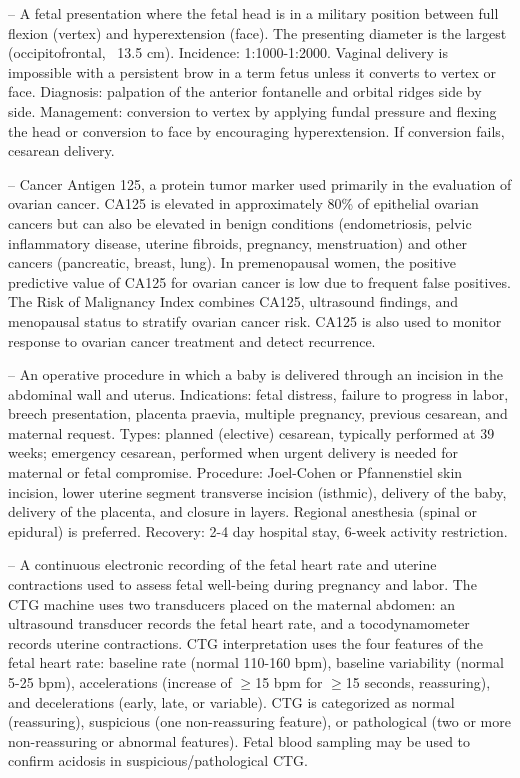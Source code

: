 -- A fetal presentation where the fetal head is in a military position between full flexion (vertex) and hyperextension (face). The presenting diameter is the largest (occipitofrontal, ~13.5 cm). Incidence: 1:1000-1:2000. Vaginal delivery is impossible with a persistent brow in a term fetus unless it converts to vertex or face. Diagnosis: palpation of the anterior fontanelle and orbital ridges side by side. Management: conversion to vertex by applying fundal pressure and flexing the head or conversion to face by encouraging hyperextension. If conversion fails, cesarean delivery.

-- Cancer Antigen 125, a protein tumor marker used primarily in the evaluation of ovarian cancer. CA125 is elevated in approximately 80\% of epithelial ovarian cancers but can also be elevated in benign conditions (endometriosis, pelvic inflammatory disease, uterine fibroids, pregnancy, menstruation) and other cancers (pancreatic, breast, lung). In premenopausal women, the positive predictive value of CA125 for ovarian cancer is low due to frequent false positives. The Risk of Malignancy Index combines CA125, ultrasound findings, and menopausal status to stratify ovarian cancer risk. CA125 is also used to monitor response to ovarian cancer treatment and detect recurrence.

-- An operative procedure in which a baby is delivered through an incision in the abdominal wall and uterus. Indications: fetal distress, failure to progress in labor, breech presentation, placenta praevia, multiple pregnancy, previous cesarean, and maternal request. Types: planned (elective) cesarean, typically performed at 39 weeks; emergency cesarean, performed when urgent delivery is needed for maternal or fetal compromise. Procedure: Joel-Cohen or Pfannenstiel skin incision, lower uterine segment transverse incision (isthmic), delivery of the baby, delivery of the placenta, and closure in layers. Regional anesthesia (spinal or epidural) is preferred. Recovery: 2-4 day hospital stay, 6-week activity restriction.

-- A continuous electronic recording of the fetal heart rate and uterine contractions used to assess fetal well-being during pregnancy and labor. The CTG machine uses two transducers placed on the maternal abdomen: an ultrasound transducer records the fetal heart rate, and a tocodynamometer records uterine contractions. CTG interpretation uses the four features of the fetal heart rate: baseline rate (normal 110-160 bpm), baseline variability (normal 5-25 bpm), accelerations (increase of \(\ge\)15 bpm for \(\ge\)15 seconds, reassuring), and decelerations (early, late, or variable). CTG is categorized as normal (reassuring), suspicious (one non-reassuring feature), or pathological (two or more non-reassuring or abnormal features). Fetal blood sampling may be used to confirm acidosis in suspicious/pathological CTG.

